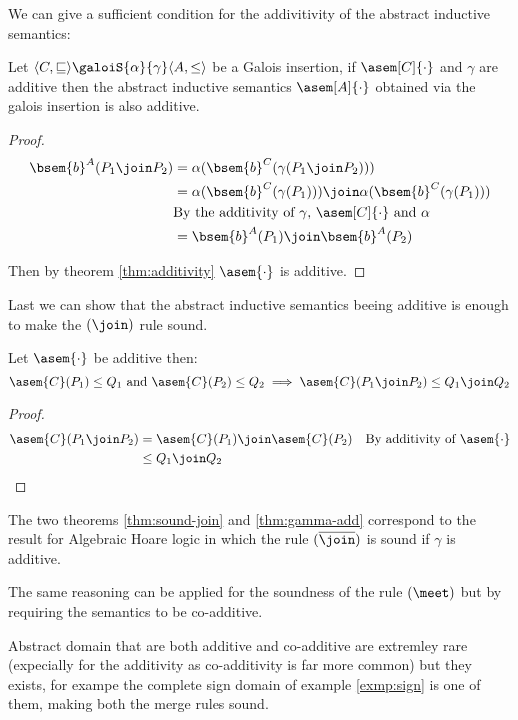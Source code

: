 We can give a sufficient condition for the addivitivity of the abstract 
inductive semantics:
\begin{theorem}
  \label{thm:gamma-add}
  Let $\langle C, \sqsubseteq \rangle \galoiS{\alpha}{\gamma} \langle A, \leq 
  \rangle$ be a Galois insertion, if $\asem[C]{\cdot}$ and $\gamma$ are 
  additive then the abstract inductive semantics $\asem[A]{\cdot}$ obtained
  via the galois insertion is also additive.
\end{theorem}
\begin{proof}
  \begin{align*}
    \bsem{b}^A(P_1 \join P_2)
      &= \alpha(\bsem{b}^C(\gamma(P_1 \join P_2))) \\
      &= \alpha(\bsem{b}^C(\gamma(P_1))) \join\alpha(\bsem{b}^C(\gamma(P_1))) \\
      &\text{By the additivity of $\gamma$, $\asem[C]{\cdot}$ and $\alpha$}\\
      &= \bsem{b}^A(P_1) \join \bsem{b}^A(P_2)
  \end{align*}

  Then by theorem \ref{thm:additivity} $\asem{\cdot}$ is additive.
\end{proof}

Last we can show that the abstract inductive semantics beeing additive is 
enough to make the $(\join)$ rule sound.

\begin{theorem}
  \label{thm:sound-join}
  Let $\asem{\cdot}$ be additive then:
  $$\asem{C}(P_1) \leq Q_1 \text{ and } \asem{C}(P_2) \leq Q_2 \implies
  \asem{C}(P_1 \join P_2) \leq Q_1 \join Q_2$$
\end{theorem}
\begin{proof}
  \begin{align*}
    \asem{C}(P_1 \join P_2)
      &= \asem{C}(P_1) \join \asem{C}(P_2)
      &\text{By additivity of $\asem{\cdot}$} \\
      &\leq Q_1 \join Q_2
  \end{align*}
\end{proof}

The two theorems \ref{thm:sound-join} and \ref{thm:gamma-add} correspond to the
result for Algebraic Hoare logic in which the rule $(\overline{\join})$ is sound
if $\gamma$ is additive.

The same reasoning can be applied for the soundness of the rule $(\meet)$ but
by requiring the semantics to be co-additive.

Abstract domain that are both additive and co-additive are extremley rare 
(expecially for the additivity as co-additivity is far more common) but they
exists, for exampe the complete sign domain of example \ref{exmp:sign} is one of
them, making both the merge rules sound.
